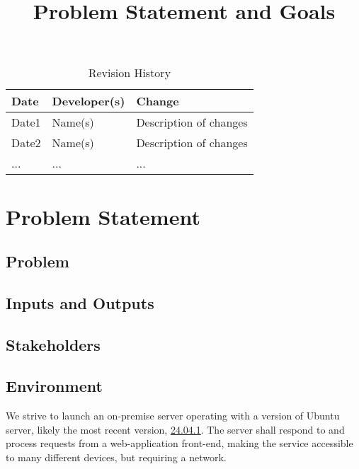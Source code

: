 \documentclass{article}
\title{Problem Statement and Goals\\\progname}
\author{\authname}
\date{}
\begin{document}
\maketitle

\begin{table}[hp]
\caption{Revision History} \label{TblRevisionHistory}
\begin{tabularx}{\textwidth}{llX}
\toprule
\textbf{Date} & \textbf{Developer(s)} & \textbf{Change}\\
\midrule
Date1 & Name(s) & Description of changes\\
Date2 & Name(s) & Description of changes\\
... & ... & ...\\
\bottomrule
\end{tabularx}
\end{table}

\section{Problem Statement}



\subsection{Problem}

\subsection{Inputs and Outputs}


\subsection{Stakeholders}

\subsection{Environment}
We strive to launch an on-premise server operating with a version of Ubuntu server, likely the most recent version, \href{https://ubuntu.com/download/server}{24.04.1}. The server shall respond to and process requests from a web-application front-end, making the service accessible to many different devices, but requiring a network.
\end{document}
